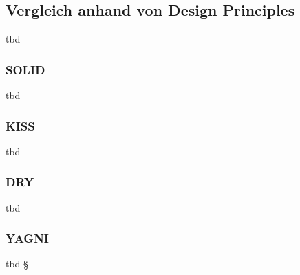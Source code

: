 \subsection{Vergleich anhand von Design Principles}
\color{red}
tbd
\color{black}

\subsubsection{SOLID}
\color{red}
tbd
\color{black}

\subsubsection{KISS}
\color{red}
tbd
\color{black}

\subsubsection{DRY}
\color{red}
tbd
\color{black}

\subsubsection{YAGNI}
\color{red}
tbd
\color{black}
§
